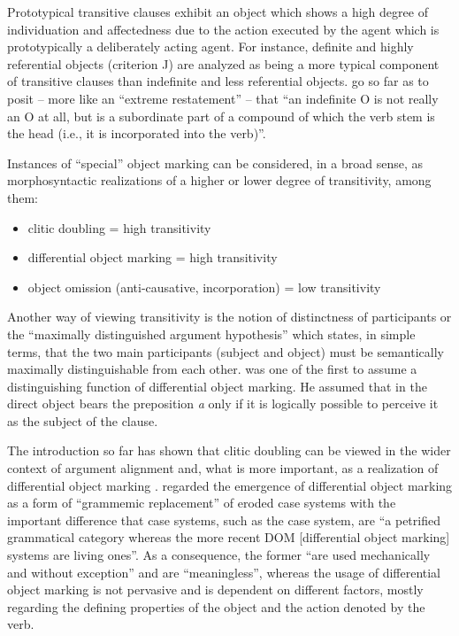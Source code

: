 \documentclass[output=paper]{langsci/langscibook}
\begin{document}
Prototypical transitive clauses exhibit an object which shows a high degree of individuation and affectedness due to the action executed by the agent which is prototypically a deliberately acting agent. For instance, definite and highly referential objects (criterion J) are analyzed as being a more typical component of transitive clauses than indefinite and less referential objects. \citet[259]{Hopper1980} go so far as to posit – more like an \enquote{extreme restatement} –  that \enquote{an indefinite O is not really an O at all, but is a subordinate part of a compound of which the verb stem is the head (i.e., it is incorporated into the verb)}.

Instances of \enquote{special} object marking can be considered, in a broad sense, as morphosyntactic realizations of a higher or lower degree of transitivity, among them:
\begin{itemize}
	\item	clitic doubling = high transitivity
	\item	differential object marking = high transitivity
	\item	object omission (anti-causative, incorporation) = low transitivity 
\end{itemize}

\noindent
Another way of viewing transitivity is the notion of distinctness of participants or the \enquote{maximally distinguished argument hypothesis} \citep{Ness2007} which states, in simple terms, that the two main participants (subject and object) must be semantically maximally distinguishable from each other. \citet[52]{Lenz1920} was one of the first to assume a distinguishing function of differential object marking. He assumed that in  the direct object bears the preposition \textit{a} only if it is logically possible to perceive it as the subject of the clause.  

The introduction so far has shown that clitic doubling can be viewed in the wider context of argument alignment and, what is more important, as a realization of differential object marking \citep{Kallulli2016}. \citet[151]{Bossong1991} regarded the emergence of differential object marking as a form of \enquote{grammemic replacement} of eroded case systems with the important difference that case systems, such as the  case system, are \enquote{a petrified grammatical category whereas the more recent DOM [differential object marking] systems are living ones}. As a consequence, the former \enquote{are used mechanically and without exception} and are \enquote{meaningless}, whereas the usage of differential object marking is not pervasive and is dependent on different factors, mostly regarding the defining properties of the object and the action denoted by the verb. 
\end{document}
